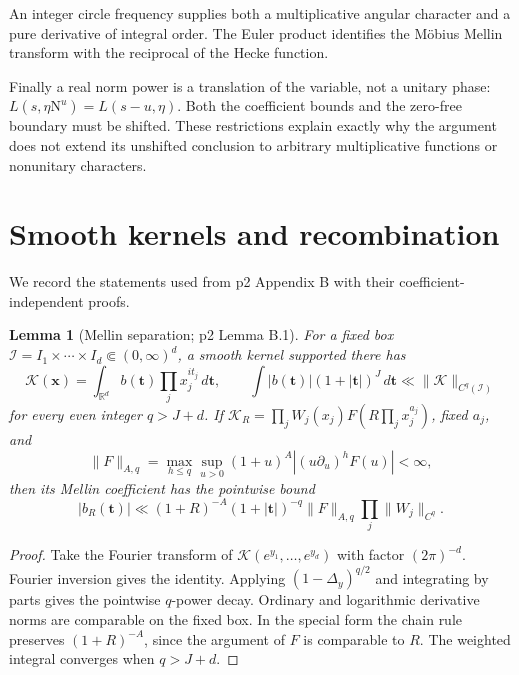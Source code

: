 \documentclass[11pt,a4paper]{article}
\numberwithin{equation}{section}
\newtheorem{lemma}[theorem]{Lemma}
\theoremstyle{definition}
\theoremstyle{remark}
\newcommand{\R}{\mathbb R}
\newcommand{\N}{\mathrm N}
\newcommand{\dd}{\,d}
\begin{document}
An integer circle frequency supplies both a multiplicative angular character and a pure derivative of integral order. The Euler product identifies the M\"obius Mellin transform with the reciprocal of the Hecke function.

Finally a real norm power is a translation of the variable, not a unitary phase: $L(s,\eta\N^u)=L(s-u,\eta)$. Both the coefficient bounds and the zero-free boundary must be shifted. These restrictions explain exactly why the argument does not extend its unshifted conclusion to arbitrary multiplicative functions or nonunitary characters.

\appendix
\section{Smooth kernels and recombination}\label{app:smooth}
We record the statements used from p2 Appendix B with their coefficient-independent proofs.
\begin{lemma}[Mellin separation; p2 Lemma B.1]\label{lem:smooth}
For a fixed box $\mathcal I=I_1\times\cdots\times I_d\Subset(0,\infty)^d$, a smooth kernel supported there has
\[
 \mathcal K(\boldsymbol x)=\int_{\R^d}b(\boldsymbol t)\prod_jx_j^{it_j}\dd\boldsymbol t,
 \qquad
 \int|b(\boldsymbol t)|(1+|\boldsymbol t|)^J\dd\boldsymbol t
 \ll\|\mathcal K\|_{C^q(\mathcal I)}
\]
for every even integer $q>J+d$. If $\mathcal K_R=\prod_jW_j(x_j)F(R\prod_jx_j^{a_j})$, fixed $a_j$, and
\[
 \|F\|_{A,q}=\max_{h\le q}\sup_{u>0}(1+u)^A|(u\partial_u)^hF(u)|<\infty,
\]
then its Mellin coefficient has the pointwise bound
\[
 |b_R(\boldsymbol t)|\ll(1+R)^{-A}(1+|\boldsymbol t|)^{-q}
 \|F\|_{A,q}\prod_j\|W_j\|_{C^q}.
\]
\end{lemma}
\begin{proof}
Take the Fourier transform of $\mathcal K(e^{y_1},\ldots,e^{y_d})$ with factor $(2\pi)^{-d}$. Fourier inversion gives the identity. Applying $(1-\Delta_y)^{q/2}$ and integrating by parts gives the pointwise $q$-power decay. Ordinary and logarithmic derivative norms are comparable on the fixed box. In the special form the chain rule preserves $(1+R)^{-A}$, since the argument of $F$ is comparable to $R$. The weighted integral converges when $q>J+d$.
\end{proof}
\end{document}

